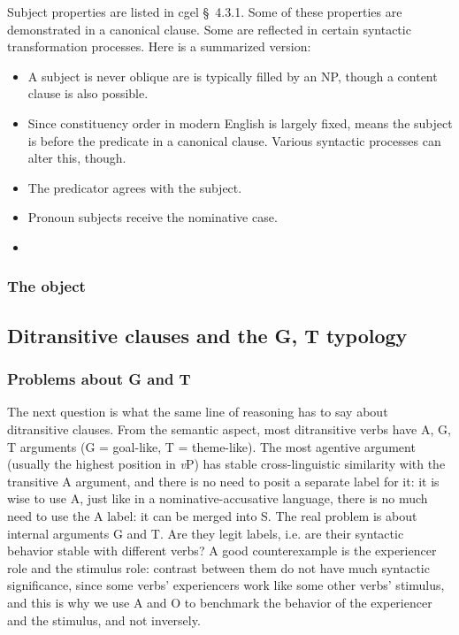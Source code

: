 \documentclass{article}
\newcommand*{\citesec}[1]{\S~{#1}}
\newcommand*{\vP}{\textit{v}P}
\begin{document}
Subject properties are listed in \ac{cgel} \citesec{4.3.1}. 
Some of these properties are demonstrated in a canonical clause.
Some are reflected in certain syntactic transformation processes.
Here is a summarized version:
\begin{itemize}
    \item A subject is never oblique are is typically filled by an NP, though a content clause is also possible.
    \item Since constituency order in modern English is largely fixed,
     means the subject is before the predicate in a canonical clause.
    Various syntactic processes can alter this, though.
    \item The predicator agrees with the subject.
    \item Pronoun subjects receive the nominative case.
    \item  
\end{itemize}

\subsubsection{The object}

\subsection{Ditransitive clauses and the G, T typology}

\subsubsection{Problems about G and T}

The next question is what the same line of reasoning has to say about ditransitive clauses. 
From the semantic aspect,
most ditransitive verbs have A, G, T arguments (G = goal-like, T = theme-like).
The most agentive argument (usually the highest position in \vP) 
has stable cross-linguistic similarity with the transitive A argument, %
and there is no need to posit a separate label for it: it is wise to use A,
just like in a nominative-accusative language, 
there is no much need to use the A label: it can be merged into S.
The real problem is about internal arguments G and T.
Are they legit labels, i.e. are their syntactic behavior stable with different verbs?
A good counterexample is the experiencer role and the stimulus role:
contrast between them do not have much syntactic significance,
since some verbs' experiencers work like some other verbs' stimulus,
and this is why we use A and O to benchmark the behavior of the experiencer and the stimulus,
and not inversely.
\end{document}
